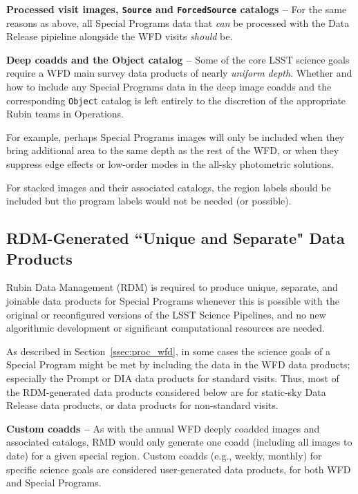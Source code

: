 \textbf{Processed visit images, {\tt Source} and {\tt ForcedSource} catalogs -- }
For the same reasons as above, all Special Programs data that 
{\it can} be processed with the Data Release pipieline alongside the WFD 
visits {\it should} be.

\textbf{Deep coadds and the Object catalog -- }
Some of the core LSST science goals require a WFD main survey data 
products of nearly {\it uniform depth}.
Whether and how to include any Special Programs data in the deep image 
coadds and the corresponding {\tt Object} catalog is left entirely to the 
discretion of the appropriate Rubin teams in Operations.

For example, perhaps Special Programs images will only be included when 
they bring additional area to the same depth as the rest of the WFD, or when they suppress edge effects or low-order modes in the 
all-sky photometric solutions.

For stacked images and their associated catalogs, the region labels should be
included but the program labels would not be needed (or possible).



\subsection{RDM-Generated ``Unique and Separate" Data Products}\label{ssec:proc_rdm}

Rubin Data Management (RDM) is required to produce unique, separate, and 
joinable data products for Special Programs whenever this is possible with the 
original or reconfigured versions of the LSST Science Pipelines, and no new 
algorithmic development or significant computational resources are needed.

As described in Section~\ref{ssec:proc_wfd}, in some cases the science goals 
of a Special Program might be met by including the data in the WFD data 
products; especially the Prompt or DIA data products for standard visits.
Thus, most of the RDM-generated data products considered below are for 
static-sky Data Release data products, or data products for non-standard visits.

\textbf{Custom coadds -- }
As with the annual WFD deeply coadded images and associated catalogs, RMD would 
only generate one coadd (including all images to date) for a given special region.
Custom coadds (e.g., weekly, monthly) for specific science goals are considered 
user-generated data products, for both WFD and Special Programs.

